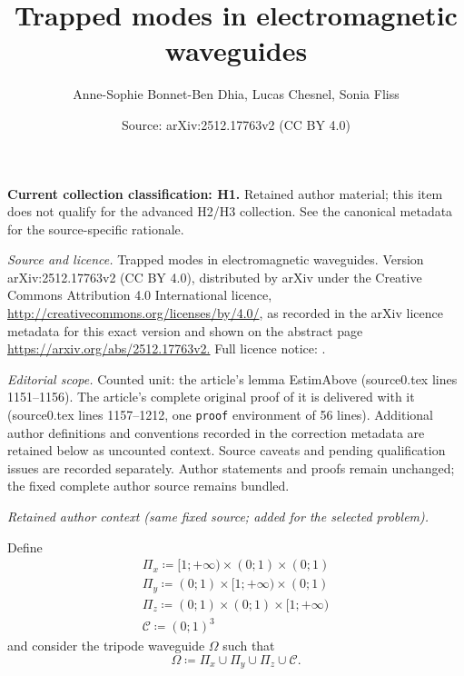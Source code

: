 \documentclass[10pt,a4paper]{amsart}
\title{Trapped modes in electromagnetic waveguides}
\author{Anne-Sophie Bonnet-Ben Dhia, Lucas Chesnel, Sonia Fliss}
\date{Source: arXiv:2512.17763v2 (CC BY 4.0)}
\newcommand{\Om}{\Omega}
\begin{document}
\maketitle
\par\medskip\noindent\textbf{Current collection classification: H1.} Retained author material; this item does not qualify for the advanced H2/H3 collection. See the canonical metadata for the source-specific rationale.\par\medskip


{\sloppy \noindent\emph{Source and licence.} Trapped modes in electromagnetic waveguides. Version arXiv:2512.17763v2 (CC BY 4.0), distributed by arXiv under the Creative Commons Attribution 4.0 International licence, \url{http://creativecommons.org/licenses/by/4.0/}, as recorded in the arXiv licence metadata for this exact version and shown on the abstract page \url{https://arxiv.org/abs/2512.17763v2.} Full licence notice: .\par\smallskip\par}

\noindent\textit{Editorial scope.} Counted unit: the article's lemma EstimAbove (source0.tex lines 1151--1156). The article's complete original proof of it is delivered with it (source0.tex lines 1157--1212, one \texttt{proof} environment of 56 lines). Additional author definitions and conventions recorded in the correction metadata are retained below as uncounted context. Source caveats and pending qualification issues are recorded separately. Author statements and proofs remain unchanged; the fixed complete author source remains bundled.\par\medskip
\par\medskip\noindent\textit{Retained author context (same fixed source; added for the selected problem).}\par
\noindent Define
\[
\begin{array}{l}
\Pi_x\coloneqq[1;+\infty)\times(0;1)\times(0;1)\\[2pt]
\Pi_y\coloneqq(0;1)\times[1;+\infty)\times(0;1)\\[2pt]
\Pi_z\coloneqq(0;1)\times(0;1)\times[1;+\infty)\\[2pt]
\mathcal{C}\coloneqq(0;1)^3
\end{array}
\]
and consider the tripode waveguide $\Om$ such that
\begin{equation}\label{DefTripode}
\Om\coloneqq\Pi_x\cup\Pi_y\cup\Pi_z\cup\mathcal{C}.
\end{equation}
\end{document}
